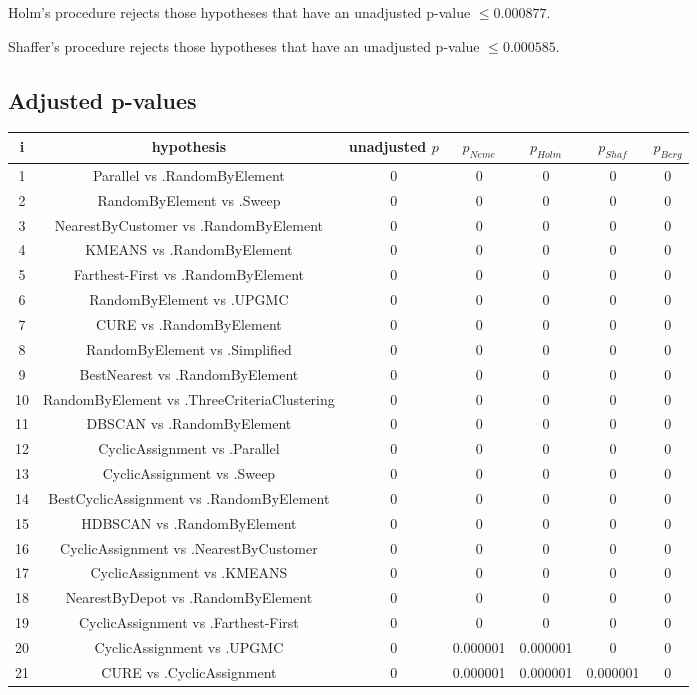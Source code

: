 \documentclass[a4paper,10pt]{article}
\begin{document}
\begin{landscape}
Holm's procedure rejects those hypotheses that have an unadjusted p-value $\le0.000877$.

Shaffer's procedure rejects those hypotheses that have an unadjusted p-value $\le0.000585$.

\pagebreak

\subsection{Adjusted p-values}

\begin{table}[!htp]
\centering\scriptsize
\begin{tabular}{ccccccc}
i&hypothesis&unadjusted $p$&$p_{Neme}$&$p_{Holm}$&$p_{Shaf}$&$p_{Berg}$\\
\hline1&Parallel vs .RandomByElement&0&0&0&0&0\\
2&RandomByElement vs .Sweep&0&0&0&0&0\\
3&NearestByCustomer vs .RandomByElement&0&0&0&0&0\\
4&KMEANS vs .RandomByElement&0&0&0&0&0\\
5&Farthest-First vs .RandomByElement&0&0&0&0&0\\
6&RandomByElement vs .UPGMC&0&0&0&0&0\\
7&CURE vs .RandomByElement&0&0&0&0&0\\
8&RandomByElement vs .Simplified&0&0&0&0&0\\
9&BestNearest vs .RandomByElement&0&0&0&0&0\\
10&RandomByElement vs .ThreeCriteriaClustering&0&0&0&0&0\\
11&DBSCAN vs .RandomByElement&0&0&0&0&0\\
12&CyclicAssignment vs .Parallel&0&0&0&0&0\\
13&CyclicAssignment vs .Sweep&0&0&0&0&0\\
14&BestCyclicAssignment vs .RandomByElement&0&0&0&0&0\\
15&HDBSCAN vs .RandomByElement&0&0&0&0&0\\
16&CyclicAssignment vs .NearestByCustomer&0&0&0&0&0\\
17&CyclicAssignment vs .KMEANS&0&0&0&0&0\\
18&NearestByDepot vs .RandomByElement&0&0&0&0&0\\
19&CyclicAssignment vs .Farthest-First&0&0&0&0&0\\
20&CyclicAssignment vs .UPGMC&0&0.000001&0.000001&0&0\\
21&CURE vs .CyclicAssignment&0&0.000001&0.000001&0.000001&0\\

\end{tabular}
\end{table}
\end{landscape}
\end{document}
